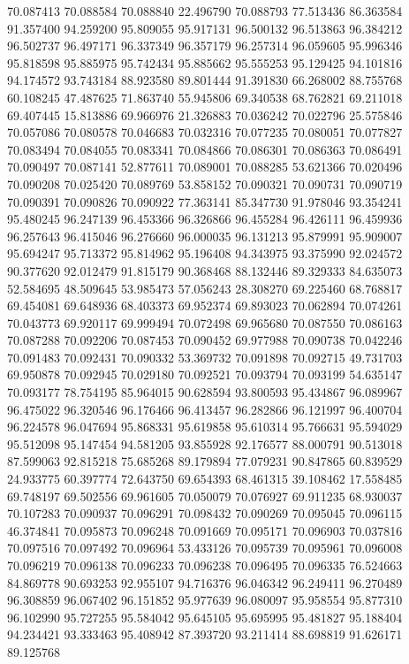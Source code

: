 70.087413
70.088584
70.088840
22.496790
70.088793
77.513436
86.363584
91.357400
94.259200
95.809055
95.917131
96.500132
96.513863
96.384212
96.502737
96.497171
96.337349
96.357179
96.257314
96.059605
95.996346
95.818598
95.885975
95.742434
95.885662
95.555253
95.129425
94.101816
94.174572
93.743184
88.923580
89.801444
91.391830
66.268002
88.755768
60.108245
47.487625
71.863740
55.945806
69.340538
68.762821
69.211018
69.407445
15.813886
69.966976
21.326883
70.036242
70.022796
25.575846
70.057086
70.080578
70.046683
70.032316
70.077235
70.080051
70.077827
70.083494
70.084055
70.083341
70.084866
70.086301
70.086363
70.086491
70.090497
70.087141
52.877611
70.089001
70.088285
53.621366
70.020496
70.090208
70.025420
70.089769
53.858152
70.090321
70.090731
70.090719
70.090391
70.090826
70.090922
77.363141
85.347730
91.978046
93.354241
95.480245
96.247139
96.453366
96.326866
96.455284
96.426111
96.459936
96.257643
96.415046
96.276660
96.000035
96.131213
95.879991
95.909007
95.694247
95.713372
95.814962
95.196408
94.343975
93.375990
92.024572
90.377620
92.012479
91.815179
90.368468
88.132446
89.329333
84.635073
52.584695
48.509645
53.985473
57.056243
28.308270
69.225460
68.768817
69.454081
69.648936
68.403373
69.952374
69.893023
70.062894
70.074261
70.043773
69.920117
69.999494
70.072498
69.965680
70.087550
70.086163
70.087288
70.092206
70.087453
70.090452
69.977988
70.090738
70.042246
70.091483
70.092431
70.090332
53.369732
70.091898
70.092715
49.731703
69.950878
70.092945
70.029180
70.092521
70.093794
70.093199
54.635147
70.093177
78.754195
85.964015
90.628594
93.800593
95.434867
96.089967
96.475022
96.320546
96.176466
96.413457
96.282866
96.121997
96.400704
96.224578
96.047694
95.868331
95.619858
95.610314
95.766631
95.594029
95.512098
95.147454
94.581205
93.855928
92.176577
88.000791
90.513018
87.599063
92.815218
75.685268
89.179894
77.079231
90.847865
60.839529
24.933775
60.397774
72.643750
69.654393
68.461315
39.108462
17.558485
69.748197
69.502556
69.961605
70.050079
70.076927
69.911235
68.930037
70.107283
70.090937
70.096291
70.098432
70.090269
70.095045
70.096115
46.374841
70.095873
70.096248
70.091669
70.095171
70.096903
70.037816
70.097516
70.097492
70.096964
53.433126
70.095739
70.095961
70.096008
70.096219
70.096138
70.096233
70.096238
70.096495
70.096335
76.524663
84.869778
90.693253
92.955107
94.716376
96.046342
96.249411
96.270489
96.308859
96.067402
96.151852
95.977639
96.080097
95.958554
95.877310
96.102990
95.727255
95.584042
95.645105
95.695995
95.481827
95.188404
94.234421
93.333463
95.408942
87.393720
93.211414
88.698819
91.626171
89.125768
